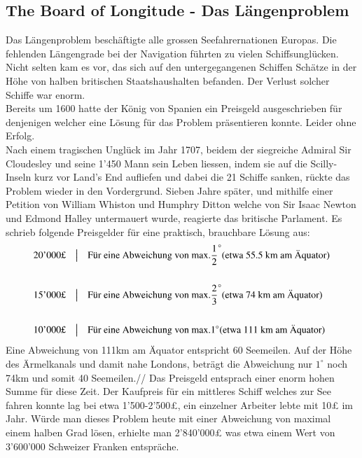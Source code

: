 \begin{refsection}
\begin{refsection}
\section{The Board of Longitude - Das Längenproblem}
Das Längenproblem beschäftigte alle grossen Seefahrernationen Europas. Die fehlenden Längengrade bei der Navigation führten zu vielen Schiffsunglücken. Nicht selten kam es vor, das sich auf den untergegangenen Schiffen Schätze in der Höhe von halben britischen Staatshaushalten befanden. Der Verlust solcher Schiffe war enorm.\\
Bereits um 1600 hatte der König von Spanien ein Preisgeld ausgeschrieben für denjenigen welcher eine Lösung für das Problem präsentieren konnte. Leider ohne Erfolg. \\
Nach einem tragischen Unglück im Jahr 1707, beidem der siegreiche Admiral Sir Cloudesley und seine 1’450 Mann sein Leben liessen, indem sie auf die Scilly-Inseln kurz vor Land’s End aufliefen und dabei die 21 Schiffe sanken, rückte das Problem wieder in den Vordergrund.
Sieben Jahre später, und mithilfe einer Petition von William Whiston und Humphry Ditton welche von Sir Isaac Newton und Edmond Halley untermauert wurde, reagierte das britische Parlament.
Es schrieb folgende Preisgelder für eine praktisch, brauchbare Lösung aus:
\[
\begin{aligned}
&\text{20’000£}
&
&\text{\big \vert}
&
&\text{Für eine Abweichung von max.} \frac{1}{2}^{\circ} \text{(etwa 55.5 km am Äquator)}
\\
\\
&\text{15’000£}
&
&\text{\big \vert}
&
&\text{Für eine Abweichung von max.} \frac{2}{3}^{\circ} \text{(etwa 74 km am Äquator)}
\\
\\
&\text{10’000£}
&
&\text{\big \vert}
&
&\text{Für eine Abweichung von max.} 1 ^{\circ} \text{(etwa 111 km am Äquator)}
\end{aligned}
\]
Eine Abweichung von 111km am Äquator entspricht 60 Seemeilen.
Auf der Höhe des Ärmelkanals und damit nahe Londons, beträgt die Abweichung nur $1 ^{\circ}$ noch 74km und somit 40 Seemeilen.//
Das Preisgeld entsprach einer enorm hohen Summe für diese Zeit. Der Kaufpreis für ein mittleres Schiff welches zur See fahren konnte lag bei etwa 1’500-2’500£, ein einzelner Arbeiter lebte mit 10£ im Jahr.
Würde man dieses Problem heute mit einer Abweichung von maximal einem halben Grad lösen, erhielte man 2’840’000£ was etwa einem Wert von 3’600’000 Schweizer Franken entspräche. 


\end{refsection}
\end{refsection}
